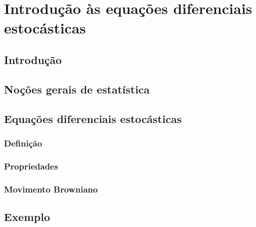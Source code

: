 \chapter{Introdução às equações diferenciais estocásticas} \label{cap:ch02_introducao_a_sde}

\section{Introdução} \label{sec:ch02_introducao}

\section{Noções gerais de estatística}

\section{Equações diferenciais estocásticas}

\subsection{Definição}

\subsection{Propriedades}

\subsection{Movimento Browniano}

\section{Exemplo}